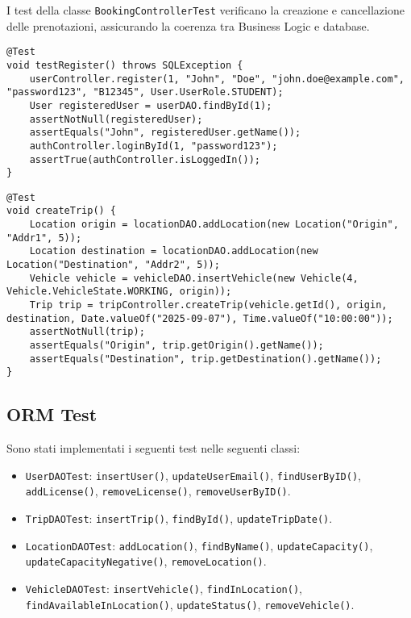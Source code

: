 \noindent I test della classe \texttt{BookingControllerTest} verificano la creazione e cancellazione delle prenotazioni, assicurando la coerenza tra Business Logic e database.

\begin{lstlisting}[style=java, caption={Registrazione di un utente in UserControllerTest}]
@Test
void testRegister() throws SQLException {
    userController.register(1, "John", "Doe", "john.doe@example.com", "password123", "B12345", User.UserRole.STUDENT);
    User registeredUser = userDAO.findById(1);
    assertNotNull(registeredUser);
    assertEquals("John", registeredUser.getName());
    authController.loginById(1, "password123");
    assertTrue(authController.isLoggedIn());
}
\end{lstlisting}

\begin{lstlisting}[style=java, caption={Creazione di un viaggio in TripControllerTest}]
@Test
void createTrip() {
    Location origin = locationDAO.addLocation(new Location("Origin", "Addr1", 5));
    Location destination = locationDAO.addLocation(new Location("Destination", "Addr2", 5));
    Vehicle vehicle = vehicleDAO.insertVehicle(new Vehicle(4, Vehicle.VehicleState.WORKING, origin));
    Trip trip = tripController.createTrip(vehicle.getId(), origin, destination, Date.valueOf("2025-09-07"), Time.valueOf("10:00:00"));
    assertNotNull(trip);
    assertEquals("Origin", trip.getOrigin().getName());
    assertEquals("Destination", trip.getDestination().getName());
}
\end{lstlisting}

\subsection{ORM Test} \label{subsec:orm-test}

Sono stati implementati i seguenti test nelle seguenti classi:
\begin{itemize}
    \item \texttt{UserDAOTest}: \texttt{insertUser()}, \texttt{updateUserEmail()}, \texttt{findUserByID()}, \texttt{addLicense()}, \texttt{removeLicense()}, \texttt{removeUserByID()}.
    \item \texttt{TripDAOTest}: \texttt{insertTrip()}, \texttt{findById()}, \texttt{updateTripDate()}.
    \item \texttt{LocationDAOTest}: \texttt{addLocation()}, \texttt{findByName()}, \texttt{updateCapacity()}, \texttt{updateCapacityNegative()}, \texttt{removeLocation()}.
    \item \texttt{VehicleDAOTest}: \texttt{insertVehicle()}, \texttt{findInLocation()}, \texttt{findAvailableInLocation()}, \texttt{updateStatus()}, \texttt{removeVehicle()}.
\end{itemize}

